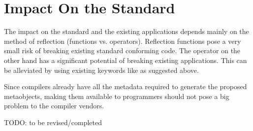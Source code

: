 \section{Impact On the Standard}

The impact on the standard and the existing applications depends
mainly on the method of reflection (functions vs. operators).
Reflection functions pose a very small risk of breaking existing
standard conforming code. The \verb@reflect@ operator on the other
hand has a significant potential of breaking existing applications.
This can be alleviated by using existing keywords like \verb@%@
as suggested above.

Since compilers already have all the metadata required to generate
the proposed metaobjects, making them available to programmers
should not pose a big problem to the compiler vendors.

TODO: to be revised/completed
